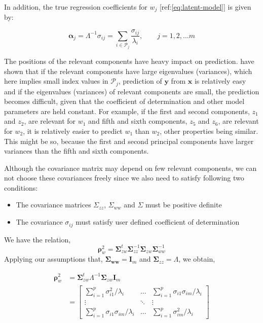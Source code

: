 \documentclass[review]{elsarticle}
\providecommand{\tightlist}{%
  \setlength{\itemsep}{0pt}\setlength{\parskip}{0pt}}
\theoremstyle{definition}
\theoremstyle{definition}
\theoremstyle{remark}
\begin{document}
In addition, the true regression coefficients for \(w_j\)
{[}ref:\eqref{eq:latent-model}{]} is given by:

\[
\boldsymbol{\alpha}_j = \Lambda^{-1} \sigma_{ij} = \sum_{i \in \mathcal{P}_j}\frac{\sigma_{ij}}{\lambda_i},\qquad j = 1, 2, \ldots m
\]

The positions of the relevant components have heavy impact on
prediction. \citet{helland1994comparison} have shown that if the
relevant components have large eigenvalues (variances), which here
implies small index values in \(\mathcal{P}_j\), prediction of
\(\mathbf{y}\) from \(\mathbf{x}\) is relatively easy and if the
eigenvalues (variances) of relevant components are small, the prediction
becomes difficult, given that the coefficient of determination and other
model parameters are held constant. For example, if the first and second
components, \(z_1\) and \(z_2\), are relevant for \(w_1\) and fifth and
sixth components, \(z_5\) and \(z_6\), are relevant for \(w_2\), it is
relatively easier to predict \(w_1\) than \(w_2\), other properties
being similar. This might be so, because the first and second principal
components have larger variances than the fifth and sixth components.

Although the covariance matrix may depend on few relevant components, we
can not choose these covariances freely since we also need to satisfy
following two conditions:

\begin{itemize}
\tightlist
\item
  The covariance matrices \(\Sigma_{zz}\), \(\Sigma_{ww}\) and
  \(\Sigma\) must be positive definite
\item
  The covariance \(\sigma_{ij}\) must satisfy user defined coefficient
  of determination
\end{itemize}

We have the relation,
\[\boldsymbol{\rho}_w^2 = \boldsymbol{\Sigma}_{zw}^t\boldsymbol{\Sigma}_{zz}^{-1}\boldsymbol{\Sigma}_{zw}\boldsymbol{\Sigma}_{ww}^{-1}\]
Applying our assumptions that,
\(\boldsymbol{\Sigma_{ww}} = \mathbf{I}_m\) and
\(\boldsymbol{\Sigma}_{zz} = \Lambda\), we obtain,

\[
\begin{aligned}
\boldsymbol{\rho}_w^2 &= \boldsymbol{\Sigma}_{zw}^t \Lambda^{-1} \boldsymbol{\Sigma}_{zw} \mathbf{I}_m \\
&= \begin{bmatrix}
\sum_{i = 1}^p \sigma_{i1}^2/\lambda_i          & \ldots & \sum_{i = 1}^p \sigma_{i1}\sigma_{im}/\lambda_i \\
\vdots                                          & \ddots & \vdots \\
\sum_{i = 1}^p \sigma_{i1}\sigma_{im}/\lambda_i & \ldots & \sum_{i = 1}^p \sigma_{im}^2/\lambda_i
\end{bmatrix}
\end{aligned}
\]
\end{document}
